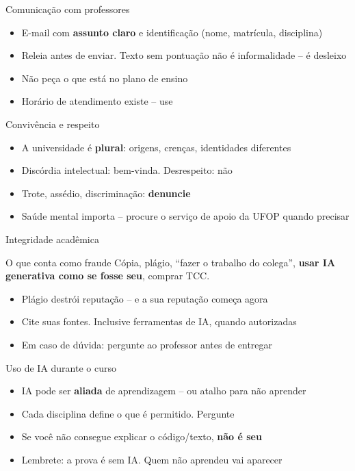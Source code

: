\documentclass[aspectratio=169]{beamer}
\newcommand{\impt}[1]{\textcolor{maccent}{\textbf{#1}}}
\newcommand{\ntc}[1]{\textcolor{mprimary}{#1}}
\begin{document}
\begin{frame}{Comunica\c{c}\~ao com professores}
\begin{itemize}
  \item E-mail com \impt{assunto claro} e identifica\c{c}\~ao (nome, matr\'icula, disciplina)
  \pause
  \item Releia antes de enviar. Texto sem pontua\c{c}\~ao n\~ao \'e informalidade -- \'e desleixo
  \pause
  \item \ntc{N\~ao pe\c{c}a} o que est\'a no plano de ensino
  \pause
  \item Hor\'ario de atendimento existe -- use
\end{itemize}
\end{frame}

\begin{frame}{Convivência e respeito}
\begin{itemize}
  \item A universidade \'e \impt{plural}: origens, cren\c{c}as, identidades diferentes
  \pause
  \item Disc\'ordia intelectual: bem-vinda. Desrespeito: n\~ao
  \pause
  \item Trote, ass\'edio, discrimina\c{c}\~ao: \impt{denuncie}
  \pause
  \item Sa\'ude mental importa -- procure o servi\c{c}o de apoio da UFOP quando precisar
\end{itemize}
\end{frame}

\begin{frame}{Integridade acad\^emica}
\begin{alertblock}{O que conta como fraude}
C\'opia, plágio, ``fazer o trabalho do colega'', \impt{usar IA generativa como se fosse seu}, comprar TCC.
\end{alertblock}
\pause
\begin{itemize}
  \item Plágio destr\'oi reputa\c{c}\~ao -- e a sua reputa\c{c}\~ao come\c{c}a agora
  \pause
  \item \ntc{Cite suas fontes}. Inclusive ferramentas de IA, quando autorizadas
  \pause
  \item Em caso de d\'uvida: pergunte ao professor antes de entregar
\end{itemize}
\end{frame}

\begin{frame}{Uso de IA durante o curso}
\begin{itemize}
  \item IA pode ser \impt{aliada} de aprendizagem -- ou atalho para n\~ao aprender
  \pause
  \item Cada disciplina define o que \'e permitido. \ntc{Pergunte}
  \pause
  \item Se voc\^e n\~ao consegue explicar o c\'odigo/texto, \impt{n\~ao \'e seu}
  \pause
  \item Lembrete: a prova \'e sem IA. Quem n\~ao aprendeu vai aparecer
\end{itemize}
\end{frame}
\end{document}
